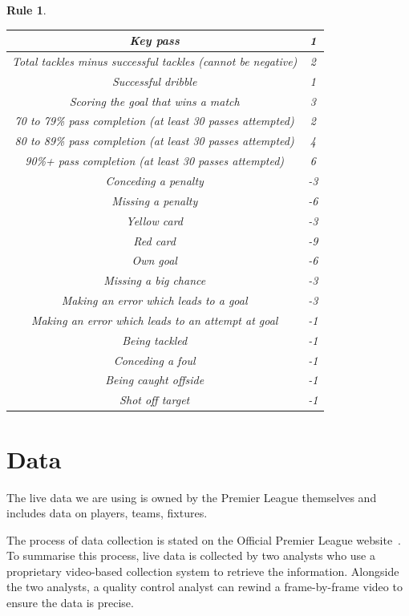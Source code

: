 \documentclass[12pt, a4paper, oneside]{book}
\newtheorem{rules}[theorem]{Rule}
\numberwithin{equation}{section}
\begin{document}
\begin{rules}
\begin{itemize}
\begin{center}
\begin{tabular}{ |c|c| }
        \hline
        Key pass & 1 \\
        \hline
        Total tackles minus successful tackles (cannot be negative) & 2 \\
        \hline
        Successful dribble & 1 \\
        \hline
        Scoring the goal that wins a match & 3 \\
        \hline
        70 to 79\% pass completion (at least 30 passes attempted) & 2 \\
        \hline
        80 to 89\% pass completion (at least 30 passes attempted) & 4 \\
        \hline
        90\%+ pass completion (at least 30 passes attempted) & 6 \\
        \hline
        Conceding a penalty & -3 \\
        \hline
        Missing a penalty & -6 \\
        \hline
        Yellow card & -3 \\
        \hline
        Red card & -9 \\
        \hline
        Own goal & -6 \\
        \hline
        Missing a big chance & -3 \\
        \hline
        Making an error which leads to a goal & -3 \\
        \hline
        Making an error which leads to an attempt at goal & -1 \\
        \hline
        Being tackled & -1 \\
        \hline
        Conceding a foul & -1 \\
        \hline
        Being caught offside & -1 \\
        \hline
        Shot off target & -1 \\
        \hline
      \end{tabular}
    \end{center}
  \end{itemize}
\end{rules}

\chapter{Data}\label{ch:3}

The live data we are using is owned by the Premier League themselves and includes data on players, teams, fixtures.

The process of data collection is stated on the Official Premier League website~\cite{Premier League Data Capture}. To
summarise this process, live data is collected by two analysts who use a proprietary
video-based collection system to retrieve the information. Alongside the two analysts, a
quality control analyst can rewind a frame-by-frame video to ensure the data is precise.
\end{document}

